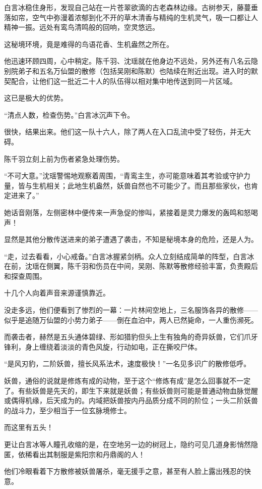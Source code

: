 白言冰稳住身形，发现自己站在一片苍翠欲滴的古老森林边缘。古树参天，藤蔓垂落如帘，空气中弥漫着浓郁到化不开的草木清香与精纯的生机灵气，吸一口都让人精神一振。远处有鸾鸟清鸣般的回响，空灵悠远。

这秘境环境，竟是难得的鸟语花香、生机盎然之所在。

他迅速环顾四周，心中稍定。陈千羽、沈瑶就在他身边不远处，另外还有八名云隐别院弟子和五名万仙盟的散修（包括吴刚和陈默）也陆续在附近出现。进入时的默契配合，让他们这一批近二十人的队伍得以相对集中地传送到同一片区域。

这已是极大的优势。

“清点人数，检查伤势。”白言冰沉声下令。

很快，结果出来。他们这一队十六人，除了两人在入口乱流中受了轻伤，并无大碍。

陈千羽立刻上前为伤者紧急处理伤势。

“不可大意。”沈瑶警惕地观察着周围，“青鸾主生，亦可能意味着其考验或守护力量，皆与生机相关；此地生机盎然，妖兽自然也不可能少了。而且那些家伙，也肯定进来了。”

她话音刚落，左侧密林中便传来一声急促的惨叫，紧接着是灵力爆发的轰鸣和怒喝声！

显然是其他分散传送进来的弟子遭遇了袭击，不知是秘境本身的危险，还是人为。

“走，过去看看，小心戒备。”白言冰握紧剑柄。众人立刻结成简单的阵型，白言冰在前，沈瑶在侧翼，陈千羽和伤员在中间，吴刚、陈默等散修经验丰富，负责殿后和探查周围。

十几个人向着声音来源谨慎靠近。

没走多远，他们便看到了惨烈的一幕：一片林间空地上，三名服饰各异的散修——似乎是追随万仙盟的小势力弟子——倒在血泊中，两人已然毙命，一人重伤濒死。

而袭击者，赫然是五头通体碧绿、形如猎豹但头上生有独角的奇异妖兽，它们爪牙锋利，身上缠绕着淡淡的青色风旋，行动如电，正在撕咬尸体。

“是风刃豹，二阶妖兽，擅长风系法术，速度极快！”一名见多识广的散修低呼。

妖兽，通俗的说就是修炼有成的动物，至于这个“修炼有成”是怎么回事就不一定了。有些妖兽是先天的，即生下来就是妖兽；有些妖兽则可能是普通动物血脉觉醒或偶得机缘，后天成为的。内域把妖兽按内丹品质分成不同的阶位；一头二阶妖兽的战斗力，至少相当于一位玄脉境修士。

而这里有五头！

更让白言冰等人瞳孔收缩的是，在空地另一边的树冠上，隐约可见几道身影悄然隐匿，依稀看出其制服是紫阳宗和丹鼎阁的人！

他们冷眼看着下方散修被妖兽屠杀，毫无援手之意，甚至有人脸上露出残忍的快意。

